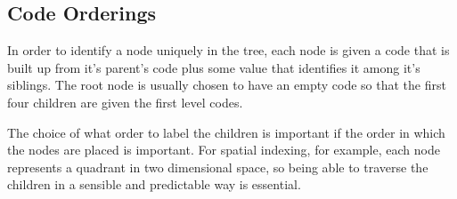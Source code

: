 \subsection{Code Orderings}
\label{sub:code_orderings}

In order to identify a node uniquely in the tree, each node is given a code
that is built up from it's parent's code plus some value that identifies it
among it's siblings. The root node is usually chosen to have an empty code so
that the first four children are given the first level codes.

The choice of what order to label the children is important if the order
in which the nodes are placed is important. For spatial indexing, for example,
each node represents a quadrant in two dimensional space, so being able to
traverse the children in a sensible and predictable way is essential.

